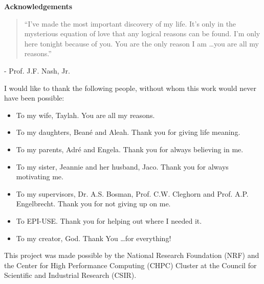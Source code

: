 \pagestyle{empty}
\begin{center}
    \Large
    \textbf{Acknowledgements}
\end{center}

\begin{quotation}
    \noindent ``I've made the most important discovery of my life. It's only in
    the mysterious equation of love that any logical reasons can be found. I'm
    only here tonight because of you. You are the only reason I am \ldots you are
    all my reasons.''
\end{quotation}
\begin{flushright}
    - Prof. J.F. Nash, Jr.
\end{flushright}

\vspace{0.3cm}
\noindent
I would like to thank the following people, without whom this work would never
have been possible:

\begin{itemize}
    \item To my wife, Taylah. You are all my reasons.

    \item To my daughters, Bean\'e and  Aleah. Thank you for giving life meaning.

    \item To my parents, Adr\'e and Engela. Thank you for always believing in me.

    \item To my sister, Jeannie and her husband, Jaco. Thank you for always motivating me.

    \item To my supervisors, Dr. A.S. Bosman, Prof. C.W. Cleghorn and Prof. A.P. Engelbrecht. Thank you for not giving up on me.

    \item To EPI-USE. Thank you for helping out where I needed it.

    \item To my creator, God. Thank You \ldots for everything!
\end{itemize}

\vspace{\fill}

\begin{center}
    This project was made possible by the National Research Foundation (NRF) and the Center for High Performance Computing (CHPC) Cluster at the Council for Scientific and Industrial Research (CSIR).
\end{center}

\newpage
